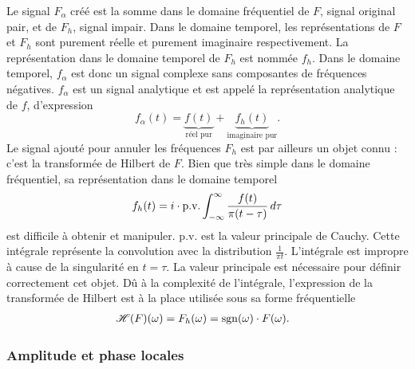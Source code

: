 Le signal $F_{\alpha}$ créé est la somme dans le domaine fréquentiel de $F$, signal original pair, et de $F_h$, signal impair. Dans le domaine temporel, les représentations de $F$
et $F_h$ sont purement réelle et purement imaginaire respectivement. La représentation dans le domaine temporel de $F_h$ est nommée $f_h$. Dans le domaine temporel, $f_{\alpha}$ est donc un signal complexe sans composantes de fréquences négatives. $f_\alpha$ est un signal analytique et est appelé la représentation analytique de $f$, d'expression
\begin{equation}
    f_{\alpha}(t) = \underbrace{f(t)}_\text{réel pur} + \underbrace{f_h(t)}_\text{imaginaire pur}.
\end{equation}
Le signal ajouté pour annuler les fréquences $F_h$ est par ailleurs un objet connu : c'est la transformée de Hilbert de $F$. Bien que très simple dans le domaine fréquentiel, sa représentation dans le domaine temporel
\begin{equation}
    f_h(t) = i \cdot \textnormal{p.v.} \int_{-\infty}^{\infty} \frac{f(t)}{\pi(t-\tau)} \,d\tau
\end{equation}
est difficile à obtenir et manipuler. p.v. est la valeur principale de Cauchy. Cette intégrale représente la convolution avec la distribution $\frac 1{\pi t}$. L'intégrale est impropre à cause de la singularité en $t=\tau$. La valeur principale est nécessaire pour définir correctement cet objet. Dû à la complexité de l'intégrale, l'expression de la transformée de Hilbert est à la place utilisée sous sa forme fréquentielle
\begin{align}
    &\operatorname{\mathscr{H}}(F)(\omega) = F_h(\omega) = \operatorname{sgn}(\omega)\cdot F(\omega).
\end{align}


\subsubsection{Amplitude et phase locales}

